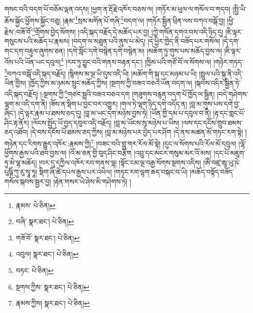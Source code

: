 གསང་བའི་བདག་པོ་བཅོམ་ལྡན་འདས། །ཕྱག་ན་རྡོ་རྗེ་འཁོར་བཅས་ལ། །གཏོར་མ་ཕུལ་ལ་གསོལ་བ་གདབ། །སྤྱི་ཡི་ཆོས་སྐྱོང་ཕྱོགས་སྐྱོང་བཅུ། །རྣམ་\footnote{རྣམས་  པེ་ཅིན། }སྲས་མགོན་པོ་གཞི་\footnote{བཞི་  སྣར་ཐང་།  པེ་ཅིན། }བདག་ལ། །གཏོར་སྦྱིན་ཕྲིན་ལས་བཀའ་བསྒོ་བྱ། །ཕྱི་རྗེས་:བཟོ་བོ་\footnote{གཟོ་བོ་  སྣར་ཐང་།  པེ་ཅིན། }གྲོགས་བྱེད་སོགས། །འདི་སྐད་བརྗོད་དེ་མཆོད་པར་བྱ། །ཀྱེ་གསོན་དགའ་བས་འདི་ཉིད་དུ། །ཇི་ལྟར་གསུངས་པའི་མཆོད་པ་རྣམས། །བདག་ལ་མཐུན་པའི་ནུས་པ་མེད། །དེ་ཕྱིར་ཁྱེད་ནི་བཟོད་པར་གསོལ། །དེ་དག་གང་དག་བརྟུལ་ཞུགས་ཅན། །དགེ་སློང་དགེ་བསྙེན་དགེ་བསྙེན་མ། །མཆོག་ཏུ་གུས་པས་མཆོད་བྱས་ལ། །ཇི་ལྟར་འོས་པའི་ཡོན་ཡང་དབུལ།\footnote{འབུལ།  སྣར་ཐང་།  པེ་ཅིན། } །རབ་ཏུ་བྱུང་བའི་གནས་བརྟན་དང་། །ཁྱིམ་པའི་གཙོ་བོ་ལ་སོགས་ལ། །གཉེར་གཏད་\footnote{བཏང་  པེ་ཅིན། }བཀའ་བསྒོ་འདི་སྐད་བརྗོད། །སྙིགས་མ་ལྔ་ཡི་དུས་འདི་ཡི། །མཆོག་གི་སྐུ་དང་མཉམ་པ་ཡི། །སྤྲུལ་པའི་སྐུ་ནི་འདི་ཡིན་གྱིས། །ཁྱོད་ཀྱིས་མ་ཉམས་སྲུང་མཆོད་ཀྱིས། །སྔགས་ཀྱི་བཟའ་བཅའ་ཡོན་བདག་ལ། །སྐབས་འདིར་སྦྱིན་ཏེ་འདི་སྐད་བརྗོད། །:སྔགས་ཀྱི་\footnote{སྔགས་ཀྱིས་  སྣར་ཐང་།  པེ་ཅིན། }གཙང་སྦྲའི་བཟའ་བཅའ་དག །གཟུགས་བརྙན་བདག་པོ་ཁྱོད་ལ་སྦྱིན། །བདེ་གཤེགས་ལྷག་མ་འདི་དག་ནི། །ཟོས་ན་སྡིག་པ་བྱང་བར་འགྱུར། །གལ་ཏེ་ལྷག་ཉིད་དགེ་འདོད་ན། །བླ་མ་གུས་པས་དགེ་བྱ་ཞིང་། །དེ་ལྟར་རྣམ་པ་ཐམས་ཅད་དུ། །བླ་མ་ཡང་དག་མཉེས་བྱས་ཏེ། །ཡོན་གྱི་དམ་པ་དབུལ་བ་ནི། །རྟ་དང་གླང་པོ་ཤིང་རྟ་ནོར། །ལོངས་སྤྱོད་ཡོ་བྱད་དབུལ་འདི་བརྗོད། །བླ་མ་ཡོངས་སུ་མཉེས་པ་ཡིས། །ལས་དང་དངོས་གྲུབ་ཐམས་ཅད་འཐོབ། །དེ་བས་དངོས་པོ་ཐམས་ཅད་ཀྱིས། །བླ་མ་མཉེས་པར་བྱེད་པར་ཤོག །དེ་ནས་མཚན་མོ་གཏང་རག་སྟེ། །གཉེན་དང་རིགས་རྒྱུད་འཁོར་:རྣམས་ཀྱི།\footnote{རྣམས་ཀྱིས།  སྣར་ཐང་།  པེ་ཅིན། } །བཟང་བའི་གླུ་གར་རོལ་མོ་སྟེ། །དུང་ལ་སོགས་པའི་རོལ་མོ་དབུལ། །ལྷོ་ཕྱོགས་རྒྱས་པའི་ཐབ་བྱས་ལ། །འོ་མ་ཅན་གྱི་བུད་ཤིང་བརྩིག །འབྲུ་དང་མངར་གསུམ་མར་འོ་མས། །དང་པོ་མཇུག་ཏུ་མེ་ལྷ་མཆོད། །བར་དུ་དཀྱིལ་འཁོར་རབ་གནས་ལྷ། །སྟོང་ངམ་ལྔ་བརྒྱ་སོགས་སྔགས་འདིས། །ཨོཾ་བཛྲ་ཨཱ་ཡུ་ཥེ་པུཥྚིཾ་ཀུ་རུ་སྭཱ་ཧཱ། སྡིག་ཞི་ཚེ་དཔལ་རྒྱས་པར་འཕེལ། །གཏང་རག་ལྷག་ཆད་བསྐང་བ་ཡི། །མཆོད་བསྟོད་བཟོད་གསོལ་སྐབས་སྦྱར་བྱ། །རྟེན་གསར་ཡེ་ཤེས་མི་གཤེགས་ཏེ། །
